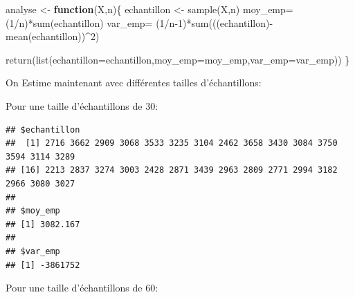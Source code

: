 \documentclass[
]{article}
\newenvironment{Shaded}{\begin{snugshade}}{\end{snugshade}}
\newcommand{\AttributeTok}[1]{\textcolor[rgb]{0.77,0.63,0.00}{#1}}
\newcommand{\ControlFlowTok}[1]{\textcolor[rgb]{0.13,0.29,0.53}{\textbf{#1}}}
\newcommand{\DecValTok}[1]{\textcolor[rgb]{0.00,0.00,0.81}{#1}}
\newcommand{\FunctionTok}[1]{\textcolor[rgb]{0.00,0.00,0.00}{#1}}
\newcommand{\NormalTok}[1]{#1}
\newcommand{\OtherTok}[1]{\textcolor[rgb]{0.56,0.35,0.01}{#1}}
\newcommand{\SpecialCharTok}[1]{\textcolor[rgb]{0.00,0.00,0.00}{#1}}
\begin{document}
\begin{Shaded}
\begin{Highlighting}[]
\NormalTok{analyse }\OtherTok{\textless{}{-}} \ControlFlowTok{function}\NormalTok{(X,n)\{}
\NormalTok{  echantillon }\OtherTok{\textless{}{-}} \FunctionTok{sample}\NormalTok{(X,n)}
\NormalTok{  moy\_emp}\OtherTok{=}\NormalTok{ (}\DecValTok{1}\SpecialCharTok{/}\NormalTok{n)}\SpecialCharTok{*}\FunctionTok{sum}\NormalTok{(echantillon)}
\NormalTok{  var\_emp}\OtherTok{=}\NormalTok{ (}\DecValTok{1}\SpecialCharTok{/}\NormalTok{n}\DecValTok{{-}1}\NormalTok{)}\SpecialCharTok{*}\FunctionTok{sum}\NormalTok{(((echantillon)}\SpecialCharTok{{-}}\FunctionTok{mean}\NormalTok{(echantillon))}\SpecialCharTok{\^{}}\DecValTok{2}\NormalTok{)}
  
  \FunctionTok{return}\NormalTok{(}\FunctionTok{list}\NormalTok{(}\AttributeTok{echantillon=}\NormalTok{echantillon,}\AttributeTok{moy\_emp=}\NormalTok{moy\_emp,}\AttributeTok{var\_emp=}\NormalTok{var\_emp))}
\NormalTok{\}}
\end{Highlighting}
\end{Shaded}

On Estime maintenant avec différentes tailles d'échantillons:

Pour une taille d'échantillons de 30:

\begin{Shaded}
\end{Shaded}

\begin{verbatim}
## $echantillon
##  [1] 2716 3662 2909 3068 3533 3235 3104 2462 3658 3430 3084 3750 3594 3114 3289
## [16] 2213 2837 3274 3003 2428 2871 3439 2963 2809 2771 2994 3182 2966 3080 3027
## 
## $moy_emp
## [1] 3082.167
## 
## $var_emp
## [1] -3861752
\end{verbatim}

Pour une taille d'échantillons de 60:

\begin{Shaded}
\end{Shaded}
\end{document}
